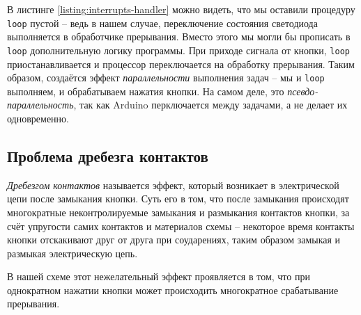 \documentclass[../sparc.tex]{subfiles}
\begin{document}
В листинге \ref{listing:interrupts-handler} можно видеть, что мы оставили
процедуру \texttt{loop} пустой -- ведь в нашем случае, переключение состояния
светодиода выполняется в обработчике прерывания.  Вместо этого мы могли бы
прописать в \texttt{loop} дополнительную логику программы.  При приходе сигнала
от кнопки, \texttt{loop} приостанавливается и процессор переключается на
обработку прерывания.  Таким образом, создаётся эффект \emph{параллельности}
выполнения задач -- мы и \texttt{loop} выполняем, и обрабатываем нажатия кнопки.
На самом деле, это \emph{псевдо-параллельность}, так как Arduino перключается
между задачами, а не делает их одновременно.

\subsection{Проблема дребезга контактов}

\emph{Дребезгом контактов} называется эффект, который возникает в электрической
цепи после замыкания кнопки.  Суть его в том, что после замыкания происходят
многократные неконтролируемые замыкания и размыкания контактов кнопки, за счёт
упругости самих контактов и материалов схемы -- некоторое время контакты кнопки
отскакивают друг от друга при соударениях, таким образом замыкая и размыкая
электрическую цепь.

В нашей схеме этот нежелательный эффект проявляется в том, что при однократном
нажатии кнопки может происходить многократное срабатывание прерывания.

\end{document}
